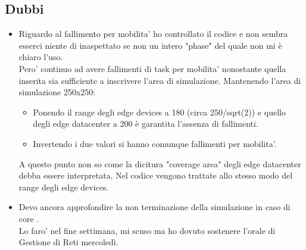 \documentclass[12pt, a4paper]{report} %
\begin{document}
\subsection*{Dubbi}
\begin{itemize}
\item Riguardo al fallimento per mobilita' ho controllato il codice e non sembra esserci niente di inaspettato se non un intero "phase" del quale non mi è chiaro l'uso.\\
Pero' continuo ad avere fallimenti di task per mobilita' nonostante quella inserita sia sufficiente a inscrivere l'area di simulazione.
Mantenendo l'area di simulazione 250x250:
\begin{itemize}
	\item Ponendo il range degli edge devices a 180 (circa 250/sqrt(2)) e quello degli edge datacenter a 200 è garantita l'assenza di fallimenti.
	\item Invertendo i due valori si hanno comunque fallimenti per mobilita'.
\end{itemize}
A questo punto non so come la dicitura "coverage area" degli edge datacenter debba essere interpretata.
Nel codice vengono trattate allo stesso modo del range degli edge devices.
\item Devo ancora approfondire la non terminazione della simulazione in caso di core .\\
Lo faro' nel fine settimana, mi scuso ma ho dovuto sostenere l'orale di Gestione di Reti mercoledì.
\end{itemize}
\end{document}
